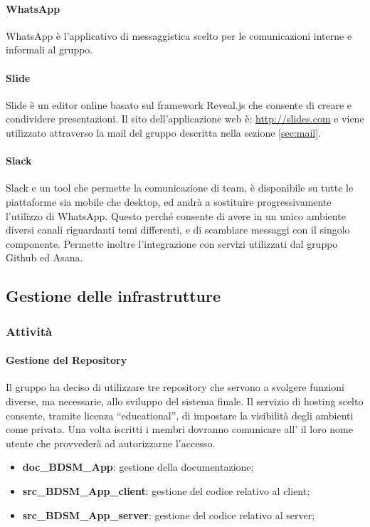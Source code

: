 			\paragraph{WhatsApp}
			WhatsApp è l'applicativo di messaggistica scelto per le comunicazioni interne e informali al gruppo.
			\paragraph{Slide}
			Slide è un editor online basato sul framework Reveal.js che consente di creare e condividere presentazioni. \newline
			Il sito dell'applicazione web è: \url{http://slides.com} e viene utilizzato attraverso la mail del gruppo descritta nella sezione \ref{sec:mail}.
			\paragraph{Slack}
			Slack e un tool che permette la comunicazione di team, è disponibile su tutte le piattaforme sia mobile che desktop, ed andrà a sostituire progressivamente l'utilizzo di WhatsApp. Questo perché consente di avere in un unico ambiente diversi canali riguardanti temi differenti, e di scambiare messaggi con il singolo componente. Permette inoltre l'integrazione con servizi utilizzati dal gruppo Github ed Asana. 


	\subsection{Gestione delle infrastrutture}

		\subsubsection{Attività}
			\paragraph{Gestione del Repository}
			Il gruppo ha deciso di utilizzare tre repository che servono a svolgere funzioni diverse, ma necessarie, allo sviluppo del sistema finale. \newline
			Il servizio di hosting scelto consente, tramite licenza ``educational'', di impostare la visibilità degli ambienti come privata. \newline
			Una volta iscritti i membri dovranno comunicare all'\roleAdministrator{} il loro nome utente che provvederà ad autorizzarne l'accesso.
				\begin{itemize}
					\item \textbf{doc\_BDSM\_App}: gestione della documentazione;
					\item \textbf{src\_BDSM\_App\_client}: gestione del codice relativo al client;
					\item \textbf{src\_BDSM\_App\_server}: gestione del codice relativo al server;
				\end{itemize}
